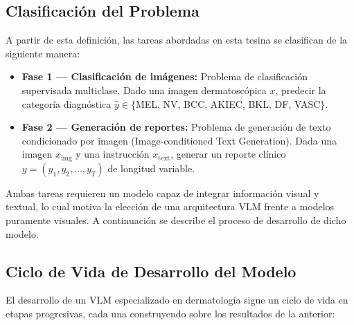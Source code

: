 \documentclass[11pt, a4paper]{article}
\begin{document}
\subsection{Clasificación del Problema}

A partir de esta definición, las tareas abordadas en esta tesina se clasifican de la siguiente manera:

\begin{itemize}
    \item \textbf{Fase 1 — Clasificación de imágenes:} Problema de clasificación supervisada multiclase. Dado una imagen dermatoscópica $x$, predecir la categoría diagnóstica $\hat{y} \in \{$MEL, NV, BCC, AKIEC, BKL, DF, VASC$\}$.
    \item \textbf{Fase 2 — Generación de reportes:} Problema de generación de texto condicionado por imagen (Image-conditioned Text Generation). Dada una imagen $x_{\text{img}}$ y una instrucción $x_{\text{text}}$, generar un reporte clínico $y = (y_1, y_2, \ldots, y_T)$ de longitud variable.
\end{itemize}

Ambas tareas requieren un modelo capaz de integrar información visual y textual, lo cual motiva la elección de una arquitectura VLM frente a modelos puramente visuales. A continuación se describe el proceso de desarrollo de dicho modelo.

\subsection{Ciclo de Vida de Desarrollo del Modelo}

El desarrollo de un VLM especializado en dermatología sigue un ciclo de vida en etapas progresivas, cada una construyendo sobre los resultados de la anterior:
\end{document}
